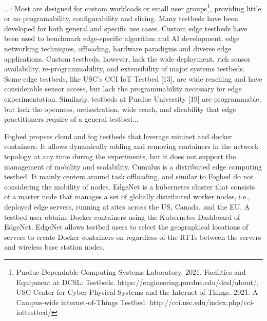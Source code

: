 \documentclass[conference]{IEEEtran}
\begin{document}
...\cite{boubin2022prowess}:
Most are designed for custom workloads\cite{meng2019dedas,munoz2017adrenaline,vasisht2017farmbeats} or small user groups\footnote{Purdue Dependable Computing Systems Laboratory. 2021. Facilities and Equipment at DCSL: Testbeds. https://engineering.purdue.edu/dcsl/about/, USC Center for Cyber-Physical Systems and the Internet of Things. 2021. A
Campus-wide internet-of-Things Testbed. http://cci.usc.edu/index.php/cci-iottestbed/}, providing little or no programability, configurability and slicing.
Many testbeds have been developed for both general and specific use cases. Custom edge testbeds have been used to benchmark edge-specific algorithm and AI development\cite{hao2018edge,zhang2019hetero}, edge networking techniques\cite{meng2019dedas,munoz2017adrenaline}, offloading\cite{gedawy2016cumulus}, hardware paradigms\cite{pan2016homecloud} and diverse edge applications\cite{boubin2019managing,vasisht2017farmbeats}. Custom testbeds, however, lack the wide deployment, rich sensor availability, re-programmability, and extensibility of
major systems testbeds. Some edge testbeds, like USC’s CCI IoT Testbed [13], are wide reaching and have considerable sensor access, but lack the programmability necessary for edge experimentation.
Similarly, testbeds at Purdue University [19] are programmable, but lack the openness, orchestration, wide reach, and slicability that edge practitioners require of a general testbed...



\par Fogbed\cite{coutinho2018fogbed} propses cloud and fog testbeds that leverage mininet and docker containers. It allows  dynamically adding and removing containers
in the network topology at any time during the experiments, but it does not support the management of mobility and scalability. Cumulus\cite{gedawy2016cumulus} is a distributed edge computing testbed. It mainly centers around task offloading, and similar to Fogbed\cite{coutinho2018fogbed} do not considering the mobility of nodes.
EdgeNet\cite{cappos2018edgenet} is a kubernetes cluster that consists of a master node that manages a set of globally distributed worker nodes, i.e., deployed edge servers, running at sites across the US, Canada, and the EU. A testbed user obtains Docker containers using the Kubernetes Dashboard of EdgeNet. EdgeNet allows testbed users to select the geographical locations of servers to create Docker containers on regardless of the RTTs between the servers and wireless base station nodes.
\end{document}
